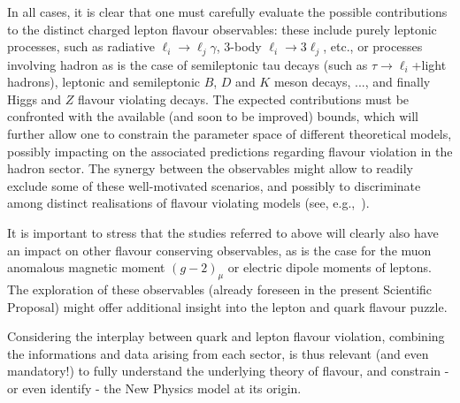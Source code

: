 In all cases, it is clear that one must 
carefully evaluate the possible contributions to the
distinct charged lepton flavour observables: these include 
purely leptonic processes, such as 
radiative $\ell_i \to \ell_j \gamma$, 3-body $\ell_i \to 3\ell_j$,
etc., or processes involving hadron as is the case of semileptonic 
tau decays (such as $\tau \to \ell_i$+light hadrons), leptonic and 
semileptonic $B$, $D$
and $K$ meson decays, ..., and finally Higgs and $Z$ flavour violating
decays.
The expected contributions must be 
confronted with the available (and soon to
be improved) bounds, which will further allow one to constrain the
parameter space of different theoretical models, possibly
impacting on the associated predictions regarding flavour
violation in the hadron sector. 
The synergy between the observables might allow to 
readily exclude some of these well-motivated scenarios, and 
possibly to discriminate among distinct realisations of 
flavour violating models 
(see, e.g.,~\cite{Abada:2014cca,Abada:2015zea,Abada:2015oba}). 

\medskip
It is important to stress that the
studies referred to above 
will clearly also have an impact on other flavour conserving 
observables, as is the case for the muon anomalous magnetic moment
$(g-2)_\mu$ 
or electric dipole moments of leptons. The exploration of these observables
(already foreseen in the present Scientific Proposal) might offer 
additional insight into the lepton and quark flavour puzzle.


\medskip
Considering the interplay between quark and lepton flavour
violation, combining the informations and data arising from each
sector, is thus relevant (and even mandatory!) to fully understand 
the underlying theory of flavour, and constrain - or even identify -
the New Physics model at its origin. 





